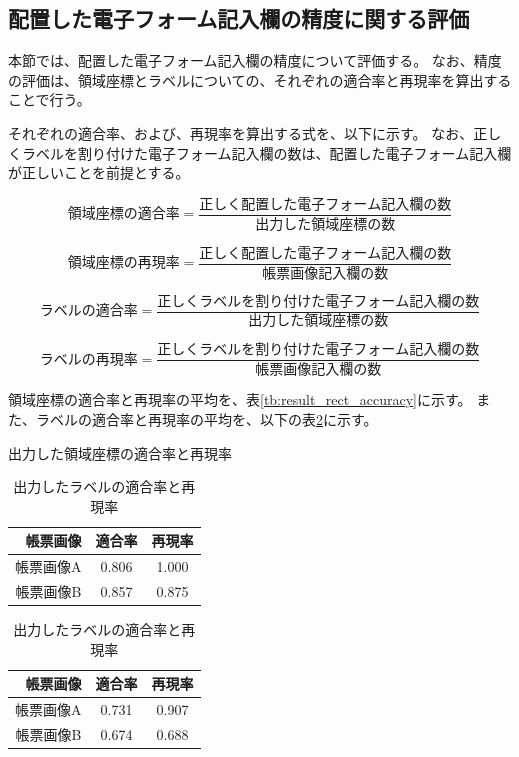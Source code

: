 \subsection{配置した電子フォーム記入欄の精度に関する評価}\label{subsec:evalue_accuracy}
本節では、配置した電子フォーム記入欄の精度について評価する。
なお、精度の評価は、領域座標とラベルについての、それぞれの適合率と再現率を算出することで行う。

それぞれの適合率、および、再現率を算出する式を、以下に示す。
なお、正しくラベルを割り付けた電子フォーム記入欄の数は、配置した電子フォーム記入欄が正しいことを前提とする。

\begin{equation}
    領域座標の適合率=\frac{正しく配置した電子フォーム記入欄の数}{出力した領域座標の数}
\end{equation}

\begin{equation}
    領域座標の再現率=\frac{正しく配置した電子フォーム記入欄の数}{帳票画像記入欄の数}
\end{equation}

\begin{equation}
    ラベルの適合率=\frac{正しくラベルを割り付けた電子フォーム記入欄の数}{出力した領域座標の数}
\end{equation}

\begin{equation}
    ラベルの再現率=\frac{正しくラベルを割り付けた電子フォーム記入欄の数}{帳票画像記入欄の数}
\end{equation}

領域座標の適合率と再現率の平均を、表\ref{tb:result_rect_accuracy}に示す。
また、ラベルの適合率と再現率の平均を、以下の表\ref{tb:result_label_accuracy}に示す。

\begin{table}[t]
    \centering
    \begin{minipage}[h]{0.47\linewidth}
        \caption{出力した領域座標の適合率と再現率}
        \label{tb:result_rect_accuracy}
        \centering
        \begin{tabular}{r|c|c}
            帳票画像 & 適合率 & 再現率 \\
            \hline \hline
            帳票画像A & 0.806 & 1.000 \\
            帳票画像B & 0.857 & 0.875 \\
        \end{tabular}
    \end{minipage}
    \begin{minipage}[h]{0.47\linewidth}
        \caption{出力したラベルの適合率と再現率}
        \label{tb:result_label_accuracy}
        \centering
        \begin{tabular}{r|c|c}
            帳票画像 & 適合率 & 再現率 \\
            \hline \hline
            帳票画像A & 0.731 & 0.907 \\
            帳票画像B & 0.674 & 0.688 \\
        \end{tabular}
    \end{minipage}
\end{table}

